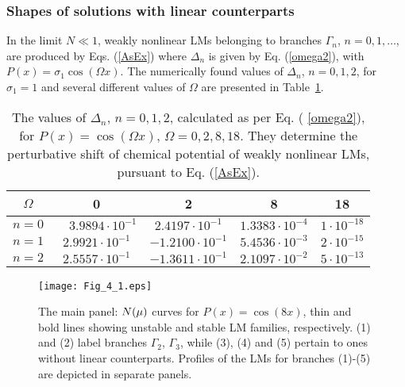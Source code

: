\documentclass[aps,preprint,showkeys,
]{revtex4}
\begin{document}
\subsubsection{Shapes of solutions with linear counterparts}

\label{Gamma_shapes}


In the limit $N\ll 1$, weakly nonlinear LMs belonging to branches $\Gamma
_{n}$, $n=0,1,\ldots $, are produced by Eqs. (\ref{AsEx}) where $\Delta _{n}$
is given by Eq. (\ref{omega2}), with $P(x)=\sigma _{1}\cos \left( \Omega
x\right) $. The numerically found values of $\Delta _{n}$, $n=0,1,2$, for $%
\sigma _{1}=1$ and several different values of $\Omega $ are presented in
Table~\ref{T2}.

\begin{table}[tbp]
\begin{tabular}{ccccc}
\hline
$\Omega$ & 0 & 2 & 8 & 18 \\[2mm] \hline
$n=0$ & $\quad 3.9894\cdot 10^{-1}$ \quad & \quad $2.4197\cdot 10^{-1}$ \quad
& \quad $1.3383\cdot 10^{-4}$ \quad & \quad $1\cdot 10^{-18}$ \quad \\[2mm]
$n=1$ & $2.9921\cdot 10^{-1}$ & $-1.2100\cdot 10^{-1}$ & $5.4536\cdot
10^{-3} $ & $2\cdot 10^{-15}$ \\[2mm]
$n=2$ & $2.5557\cdot 10^{-1}$ & $-1.3611\cdot 10^{-1}$ & $2.1097\cdot
10^{-2} $ & $5\cdot 10^{-13}$ \\ \hline
\end{tabular}%
\caption{The values of $\Delta _{n}$, $n=0,1,2$, calculated as per Eq. (%
\protect\ref{omega2}), for $P(x)=\cos \left( \Omega x\right) $, $\Omega
=0,2,8,18$. They determine the perturbative shift of chemical potential of
weakly nonlinear LMs, pursuant to Eq. (\protect\ref{AsEx}). }
\label{T2}
\end{table}

\begin{figure}[tbp]
\texttt{[image: Fig\_4\_1.eps]}%
\caption{The main panel: $N(\protect\mu )$ curves for $P(x)=\cos (8x)$, thin
and bold lines showing unstable and stable LM families, respectively. (1)
and (2) label branches $\Gamma _{2}$, $\Gamma _{3}$, while (3), (4) and (5)
pertain to ones without linear counterparts. Profiles of the LMs for
branches (1)-(5) are depicted in separate panels. }
\label{A0Om8_l}
\end{figure}
\end{document}
